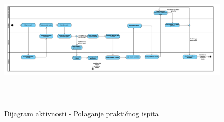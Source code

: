 \begin{figure}[H]
  \begin{center}
      \includegraphics[width=140mm, height=70mm]{Diagrams/dijagram_aktivnosti_polaganje_prakticnog_ispita.png}
  \end{center}
  \caption {Dijagram aktivnosti - Polaganje praktičnog ispita}
  \label{activity_polaganje_praktičnog_ispita}

\end{figure}
